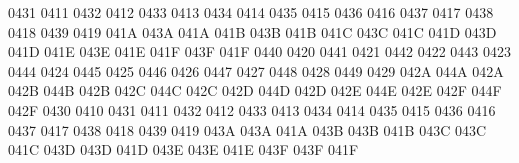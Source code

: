  0431 0411 %
 0432 0412 %
 0433 0413 %
 0434 0414 %
 0435 0415 %
 0436 0416 %
 0437 0417 %
 0438 0418 %
 0439 0419 %
\setcclcucx 041A 043A 041A %
\setcclcucx 041B 043B 041B %
\setcclcucx 041C 043C 041C %
\setcclcucx 041D 043D 041D %
\setcclcucx 041E 043E 041E %
\setcclcucx 041F 043F 041F %
 0440 0420 %
 0441 0421 %
 0442 0422 %
 0443 0423 %
 0444 0424 %
 0445 0425 %
 0446 0426 %
 0447 0427 %
 0448 0428 %
 0449 0429 %
\setcclcucx 042A 044A 042A %
\setcclcucx 042B 044B 042B %
\setcclcucx 042C 044C 042C %
\setcclcucx 042D 044D 042D %
\setcclcucx 042E 044E 042E %
\setcclcucx 042F 044F 042F %
 0430 0410 %
 0431 0411 %
 0432 0412 %
 0433 0413 %
 0434 0414 %
 0435 0415 %
 0436 0416 %
 0437 0417 %
 0438 0418 %
 0439 0419 %
\setcclcucx 043A 043A 041A %
\setcclcucx 043B 043B 041B %
\setcclcucx 043C 043C 041C %
\setcclcucx 043D 043D 041D %
\setcclcucx 043E 043E 041E %
\setcclcucx 043F 043F 041F %
